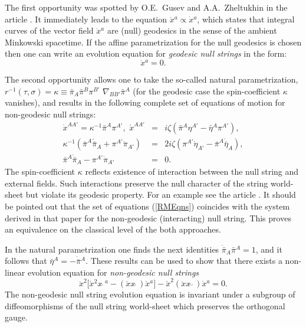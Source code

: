 \documentclass[a4paper,twocolumn,showkeys,showpacs,aps]{revtex4}
\begin{document}
The first opportunity was spotted by O.E.~Gusev and
A.A.~Zheltukhin in the article \cite{Gusev-Zheltukhin}. It
immediately leads to the equation $\ddot{x}{}^a \propto
\dot{x}{}^a$, which states that integral curves of the vector
field $\dot{x}{}^a$ are (null) geodesics in the sense of the
ambient Minkowski spacetime. If the affine parametrization for the
null geodesics is chosen then one can write an evolution equation
for \textit{geodesic null strings} in the form:
\begin{equation}\label{EvGeod}
\ddot{x}{}^a=0.
\end{equation}

The second opportunity allows one to take the so-called natural
parametrization, $r^{-1}(\tau,\sigma)=\kappa\equiv
\bar{\pi}_A\bar{\pi}{}^B\pi{}^{B'}$ $\nabla_{BB'}\bar{\pi}{}^A$
(for the geodesic case the spin-coefficient $\kappa$ vanishes),
and results in the following complete set of equations of motion
for non-geodesic null strings:
\begin{eqnarray}
\dot{x}^{AA'}\!\! = \kappa^{-1}\bar{\pi}^A\pi^{A'}\!\!,\,\,
\acute{x}^{AA'}\!\!\!\!\!\!&=&\!\!\!\! i\zeta
(\bar{\pi}{}^A\eta^{A'} - \bar{\eta}{}^A\pi^{A'}), \nonumber \\
\kappa^{-1}(\bar{\pi}^A\acute{\bar{\pi}}_A +
\pi^{A'}\acute{\pi}_{A'})\!\!\!\!&=&\!\!\!\!
2i\zeta(\pi^{A'}\dot{\eta}_{A'} -
\bar{\pi}^A\dot{\bar{\eta}}_A), \nonumber \\
\bar{\pi}^A\dot{\bar{\pi}}_A -
\pi^{A'}\dot{\pi}_{A'}\!\!\!\!&=&\!\!\!\!0.%
\label{RMEqns}
\end{eqnarray}
The spin-coefficient $\kappa$ reflects existence of interaction
between the null string and external fields. Such interactions
preserve the null character of the string world-sheet but violate
its geodesic property. For an example see the article
\cite{Ilienko2}. It should be pointed out that the set of
equations (\ref{RMEqns}) coincides with the system derived in that
paper for the non-geodesic (interacting) null string. This proves
an equivalence on the classical level of the both approaches.

In the natural parametrization one finds the next identities
$\dot{\bar{\pi}}_A\bar{\pi}{}^A=1$, and it follows that
$\bar{\eta}{}^A=-\dot{\bar{\pi}}{}^A$. These results can be used
to show that there exists a non-linear evolution equation for
\textit{non-geodesic null strings}
\begin{equation}
\ddot{x}^2\big[\acute{x}{}^2x\!\!\dot{}\,\acute{}\,{}^a -
(\acute{x}x\!\!\dot{}\,\acute{}\,)\acute{x}{}^a\big] -
\acute{x}^2(\ddot{x}x\!\!\dot{}\,\dot{}\,\acute{}\,)\dot{x}{}^a =
0.%
\label{EvEqn}
\end{equation}
The non-geodesic null string evolution equation is invariant under
a subgroup of diffeomorphisms of the null string world-sheet which
preserves the orthogonal gauge.
\end{document}
